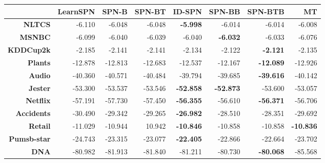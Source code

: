 \documentclass[final]{beamer}
\begin{document}
\begin{frame}{}
\begin{textblock}{25.7}
      \begin{table}[!htbp]
        \centering
        \scriptsize
        \setlength{\tabcolsep}{3pt}  
        \begin{tabular}{r r r r r r r r}
          \toprule
          & \textsf{LearnSPN} & \textsf{SPN-B} & \textsf{SPN-BT} & \textsf{ID-SPN}  & \textsf{SPN-BB}   & \textsf{SPN-BTB}  & \textsf{MT}      \\
          \midrule                                                                                     
          \textbf{NLTCS}      & -6.110            & -6.048         & -6.048          & \textbf{-5.998}  & -6.014            & -6.014            & -6.008           \\
          \textbf{MSNBC}      & -6.099            & -6.040         & -6.039          & -6.040           & \textbf{-6.032}   & -6.033            & -6.076           \\
          \textbf{KDDCup2k}   & -2.185            & -2.141         & -2.141          & -2.134           & -2.122            & \textbf{-2.121}   & -2.135           \\
          \textbf{Plants}     & -12.878           & -12.813        & -12.683         & -12.537          & -12.167           & \textbf{-12.089}  & -12.926          \\
          \textbf{Audio}      & -40.360           & -40.571        & -40.484         & -39.794          & -39.685           & \textbf{-39.616}  & -40.142          \\
          \textbf{Jester}     & -53.300           & -53.537        & -53.546         & \textbf{-52.858} & \textbf{-52.873}  & -53.600           & -53.057          \\
          \textbf{Netflix}    & -57.191           & -57.730        & -57.450         & \textbf{-56.355} & -56.610           & \textbf{-56.371}  & -56.706          \\
          \textbf{Accidents}  & -30.490           & -29.342        & -29.265         & \textbf{-26.982} & -28.510           & -28.351           & -29.692          \\
          \textbf{Retail}     & -11.029           & -10.944        & 10.942          & \textbf{-10.846} & -10.858           & -10.858           & \textbf{-10.836} \\
          \textbf{Pumsb-star} & -24.743           & -23.315        & -23.077         & \textbf{-22.405} & -22.866           & -22.664           & -23.702          \\
          \textbf{DNA}        & -80.982           & -81.913        & -81.840         & -81.211          & -80.730           & \textbf{-80.068}  & -85.568          \\

\end{tabular}
\end{table}
\end{textblock}
\end{frame}
\end{document}

